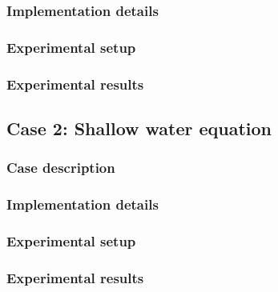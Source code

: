 \paragraph*{}

\subsubsection{Implementation details}

\subsubsection{Experimental setup}

\subsubsection{Experimental results}


\subsection{Case 2: Shallow water equation}

\subsubsection{Case description}

\subsubsection{Implementation details}

\subsubsection{Experimental setup}

\subsubsection{Experimental results}
